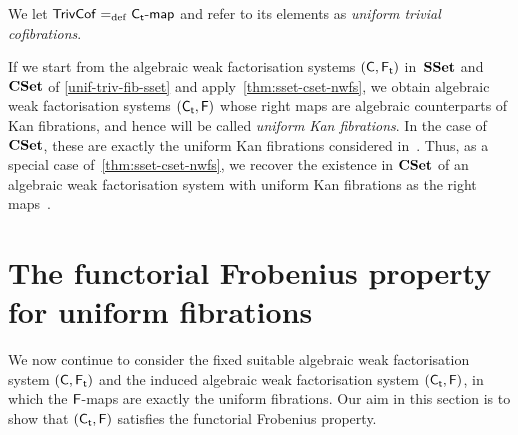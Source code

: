 \documentclass[reqno,10pt,a4paper,oneside,draft]{amsart}
\begin{document}
{{We let $\mathsf{TrivCof} =_{\operatorname{def}} {\mathsf{C_t}}\text{-}\mathsf{map}$ and refer to its elements as \emph{uniform trivial cofibrations}. 




\begin{example} \label{unif-fib-sset} If we start from the algebraic weak factorisation systems $(\mathsf{C}, \mathsf{F_t})$ in~$\mathbf{SSet}$ and~$\mathbf{CSet}$ of \cref{unif-triv-fib-sset}
and apply~\cref{thm:sset-cset-nwfs}, we obtain algebraic weak factorisation systems $(\mathsf{C_t}, \mathsf{F})$ whose right maps are algebraic counterparts of Kan fibrations,
and hence will be called \emph{uniform Kan fibrations}. In the case of $\mathbf{CSet}$, these are  exactly the uniform Kan fibrations considered in~\cite{cohen-et-al:cubicaltt}. 
Thus,  as a special case of~\cref{thm:sset-cset-nwfs}, we recover the existence in $\mathbf{CSet}$ of an algebraic weak factorisation system with uniform Kan fibrations as the right 
maps~\cite{cohen-et-al:cubicaltt,swan-awfs}.
\end{example} 




\section{The functorial Frobenius property for uniform fibrations}
\label{sec:frocuf}


We now continue to consider the fixed suitable algebraic weak factorisation system $(\mathsf{C}, \mathsf{F_t})$ and the induced 
algebraic weak factorisation system $(\mathsf{C_t}, \mathsf{F})$, in which the $\mathsf{F}$-maps are exactly the
uniform fibrations. Our aim in this section is to show that $(\mathsf{C_t}, \mathsf{F})$ satisfies the functorial
Frobenius property. 

}}
\end{document}
